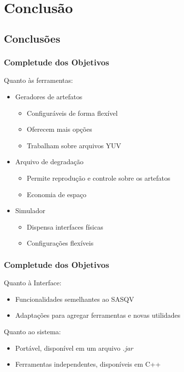 \section{Conclusão}

\subsection{Conclusões}
    \begin{frame}\frametitle{Completude dos Objetivos}
	Quanto às ferramentas:
	\begin{itemize}
		\item Geradores de artefatos
		\begin{itemize}
			\item Configuráveis de forma flexível
			\item Oferecem mais opções
			\item Trabalham sobre arquivos YUV
		\end{itemize}
		\item{Arquivo de degradação}
		\begin{itemize}
			\item Permite reprodução e controle sobre os artefatos
			\item Economia de espaço
		\end{itemize}
		\item Simulador
		\begin{itemize}
			\item Dispensa interfaces físicas
			\item Configurações flexíveis
		\end{itemize}
	\end{itemize}
    \end{frame}

	\begin{frame}\frametitle{Completude dos Objetivos}
	Quanto à Interface:
	\begin{itemize}
		\item Funcionalidades semelhantes ao SASQV
		\item Adaptações para agregar ferramentas e novas utilidades
	\end{itemize}
	Quanto ao sistema:
	\begin{itemize}
		\item Portável, disponível em um arquivo \emph{.jar}
		\item Ferramentas independentes, disponíveis em C++
	\end{itemize}
	\end{frame}
    
